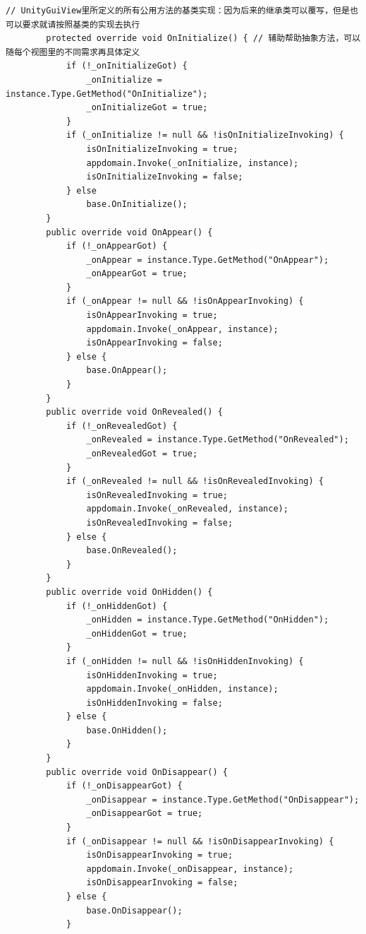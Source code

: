 \documentclass[9pt, b5paper]{article}
\begin{document}
\begin{verbatim}
// UnityGuiView里所定义的所有公用方法的基类实现：因为后来的继承类可以覆写，但是也可以要求就请按照基类的实现去执行        
        protected override void OnInitialize() { // 辅助帮助抽象方法，可以随每个视图里的不同需求再具体定义
            if (!_onInitializeGot) {
                _onInitialize = instance.Type.GetMethod("OnInitialize");
                _onInitializeGot = true;
            }
            if (_onInitialize != null && !isOnInitializeInvoking) {
                isOnInitializeInvoking = true;
                appdomain.Invoke(_onInitialize, instance);
                isOnInitializeInvoking = false;
            } else 
                base.OnInitialize();
        }
        public override void OnAppear() {
            if (!_onAppearGot) {
                _onAppear = instance.Type.GetMethod("OnAppear");
                _onAppearGot = true;
            }
            if (_onAppear != null && !isOnAppearInvoking) {
                isOnAppearInvoking = true;
                appdomain.Invoke(_onAppear, instance);
                isOnAppearInvoking = false;
            } else {
                base.OnAppear();
            }
        }
        public override void OnRevealed() {
            if (!_onRevealedGot) {
                _onRevealed = instance.Type.GetMethod("OnRevealed");
                _onRevealedGot = true;
            }
            if (_onRevealed != null && !isOnRevealedInvoking) {
                isOnRevealedInvoking = true;
                appdomain.Invoke(_onRevealed, instance);
                isOnRevealedInvoking = false;
            } else {
                base.OnRevealed();
            }
        }
        public override void OnHidden() {
            if (!_onHiddenGot) {
                _onHidden = instance.Type.GetMethod("OnHidden");
                _onHiddenGot = true;
            }
            if (_onHidden != null && !isOnHiddenInvoking) {
                isOnHiddenInvoking = true;
                appdomain.Invoke(_onHidden, instance);
                isOnHiddenInvoking = false;
            } else {
                base.OnHidden();
            }
        }
        public override void OnDisappear() {
            if (!_onDisappearGot) {
                _onDisappear = instance.Type.GetMethod("OnDisappear");
                _onDisappearGot = true;
            }
            if (_onDisappear != null && !isOnDisappearInvoking) {
                isOnDisappearInvoking = true;
                appdomain.Invoke(_onDisappear, instance);
                isOnDisappearInvoking = false;
            } else {
                base.OnDisappear();
            }

\end{verbatim}
\end{document}

